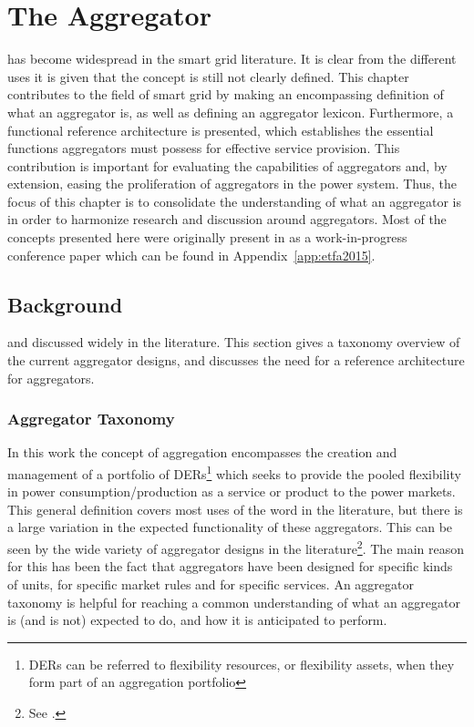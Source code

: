 \chapter{The Aggregator} %
\label{cha:aggregator}%
 has become widespread in the smart grid literature. It is clear from the different uses it is given that the concept is still not clearly defined. This chapter contributes to the field of smart grid by making an encompassing definition of what an aggregator is, as well as defining an aggregator lexicon. Furthermore, a functional reference architecture is presented, which establishes the essential functions aggregators must possess for effective service provision. This contribution is important for evaluating the capabilities of aggregators and, by extension, easing the proliferation of aggregators in the power system. Thus, the focus of this chapter is to consolidate the understanding of what an aggregator is in order to harmonize research and discussion around aggregators. Most of the concepts presented here were originally present in as a work-in-progress conference paper which can be found in Appendix~\ref{app:etfa2015}. 

\section{Background}
 and discussed widely in the literature. This section gives a taxonomy overview of the current aggregator designs, and discusses the need for a reference architecture for aggregators. 
\subsection{Aggregator Taxonomy} %
\label{sub:Aggregator Taxonomy}
In this work the concept of aggregation encompasses the creation and management of a portfolio of DERs\footnote{DERs can be referred to flexibility resources, or flexibility assets, when they form part of an aggregation portfolio} which seeks to provide the pooled flexibility in power consumption/production as a service or product to the power markets. This general definition covers most uses of the word in the literature, but there is a large variation in the expected functionality of these aggregators. This can be seen by the wide variety of aggregator designs in the literature\footnote{See \eg\cite{kok2005powermatcher,han2010development,sortomme2011optimal,costanzo2013coordination}.}. The main reason for this has been the fact that aggregators have been designed for specific kinds of units, for specific market rules and for specific services. An aggregator taxonomy is helpful for reaching a common understanding of what an aggregator is (and is not) expected to do, and how it is anticipated to perform.

